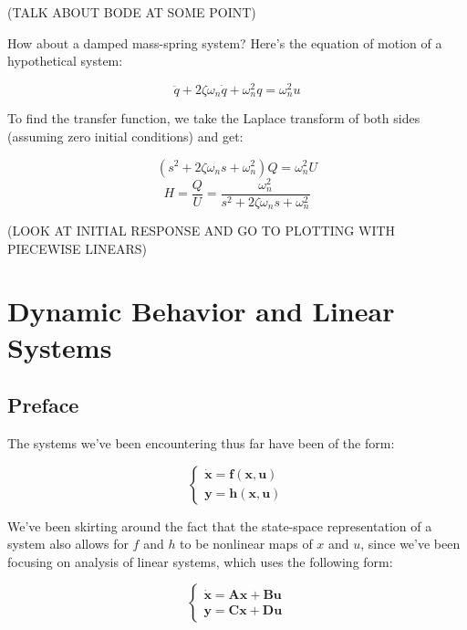 \documentclass[
  letterpaper,
  DIV=11,
  numbers=noendperiod]{scrreprt}
\begin{document}
(TALK ABOUT BODE AT SOME POINT)

How about a damped mass-spring system? Here's the equation of motion of
a hypothetical system:

\[\ddot{q}+2\zeta \omega_n \dot{q} + \omega_n^2 q = \omega_n^2 u\]

To find the transfer function, we take the Laplace transform of both
sides (assuming zero initial conditions) and get:

\[(s^2+2\zeta\omega_n s + \omega_n^2) Q = \omega_n^2 U\]
\[H = \frac{Q}{U} = \frac{\omega_n^2}{s^2+2\zeta\omega_n s + \omega_n^2}\]

(LOOK AT INITIAL RESPONSE AND GO TO PLOTTING WITH PIECEWISE LINEARS)


\hypertarget{dynamic-behavior-and-linear-systems}{%
\chapter{Dynamic Behavior and Linear
Systems}\label{dynamic-behavior-and-linear-systems}}

\hypertarget{preface-4}{%
\section*{Preface}\label{preface-4}}


The systems we've been encountering thus far have been of the form:

\begin{equation*}
    \begin{cases}
        \boldsymbol{\dot{\boldsymbol{x}}} = \boldsymbol{f}(\boldsymbol{x}, \boldsymbol{u})\\
        \boldsymbol{y} = \boldsymbol{h}(\boldsymbol{x}, \boldsymbol{u})
    \end{cases}
\end{equation*}

We've been skirting around the fact that the state-space representation
of a system also allows for \(f\) and \(h\) to be nonlinear maps of
\(x\) and \(u\), since we've been focusing on analysis of linear
systems, which uses the following form:

\begin{equation*}
    \begin{cases}
        \boldsymbol{\dot{\boldsymbol{x}}} = \textbf{A} \boldsymbol{x} + \textbf{B} \boldsymbol{u}\\
        \boldsymbol{y} = \textbf{C} \boldsymbol{x} + \textbf{D} \boldsymbol{u}
    \end{cases}
\end{equation*}
\end{document}
